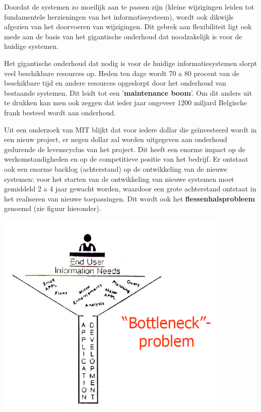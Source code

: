 Doordat de systemen zo moeilijk aan te passen zijn (kleine wijzigingen leiden tot fundamentele herzieningen van het informatiesysteem), wordt ook dikwijls afgezien van het doorvoeren van wijzigingen.
Dit gebrek aan flexibiliteit ligt ook mede aan de basis van het gigantische onderhoud dat noodzakelijk is voor de huidige systemen.


Het gigantische onderhoud dat nodig is voor de huidige informatiesystemen slorpt veel beschikbare resources op. Heden ten dage wordt 70 a 80 procent van de beschikbare tijd en andere resources opgeslorpt door het onderhoud van bestaande systemen. Dit leidt tot een '\textbf{maintenance boom}'. Om dit anders uit te drukken kan men ook zeggen dat ieder jaar ongeveer 1200 miljard Belgische frank besteed wordt aan onderhoud.

Uit een onderzoek van MIT blijkt dat voor iedere dollar die geïnvesteerd wordt in een nieuw project, er negen dollar zal worden uitgegeven aan onderhoud gedurende de levenscyclus van het project. Dit heeft een enorme impact op de werkomstandigheden en op de competitieve positie van het bedrijf. Er ontstaat ook een enorme backlog (achterstand) op de ontwikkeling van de nieuwe systemen: voor het starten van de ontwikkeling van nieuwe systemen moet gemiddeld 2 a 4 jaar gewacht worden, waardoor een grote achterstand ontstaat in het realiseren van nieuwe toepassingen. Dit wordt ook het \textbf{flessenhalsprobleem} genoemd (zie figuur hieronder).


\begin{center}
\includegraphics[width=4.4in]{img/bottleneck}%
\end{center}

